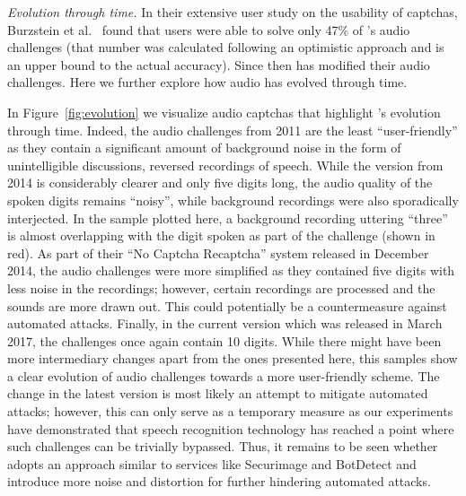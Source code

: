 \emph{Evolution through time.} In their extensive user study on the usability of captchas, Burzstein et al.~\cite{captchas-are-hard}
found that users were able to solve only 47\% of \re's audio challenges (that number was calculated following an optimistic approach
and is an upper bound to the actual accuracy). Since then \re has modified their audio challenges. %
Here we further explore how audio \re has evolved through time. 

In Figure~\ref{fig:evolution} we visualize audio captchas 
that highlight \re's evolution through time. Indeed, the audio challenges from 2011 are the least ``user-friendly'' as they contain
a significant amount of background noise in the form of unintelligible discussions, reversed recordings of speech. While the version
from 2014 is considerably clearer and only five digits long, the audio quality of the spoken digits remains ``noisy'', while background recordings were
also sporadically interjected. In the sample plotted here, a background recording uttering ``three'' is almost overlapping with the
digit spoken as part of the challenge (shown in red). As part of their ``No Captcha Recaptcha'' system released in December 2014, the audio challenges were 
more simplified as they contained five digits with less noise in the recordings; however, certain recordings are processed and the sounds
are more drawn out. This could potentially be a countermeasure against automated attacks. 
Finally, in the current version which was released in March 2017,
the challenges once again contain 10 digits. While there might have been more intermediary changes apart from the ones presented here,
this samples show a clear evolution of audio \re challenges towards a more user-friendly scheme. The change in the latest version 
is most likely an attempt to mitigate automated attacks; however, this can only serve as a temporary measure as our experiments have 
demonstrated that speech recognition technology has reached a point where such challenges can be trivially bypassed. Thus, it remains 
to be seen whether \re adopts an approach similar to services like Securimage and BotDetect and introduce more noise and distortion 
for further hindering automated attacks.
